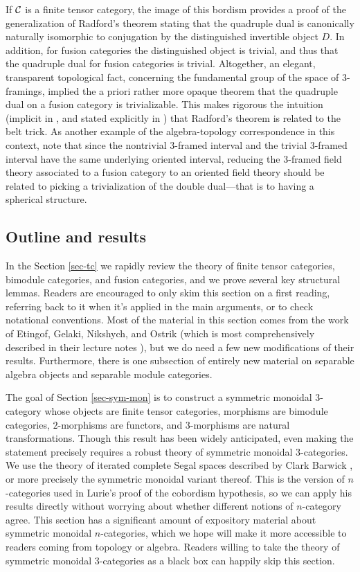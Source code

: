 \documentclass{amsart}
\begin{document}
If $\mathcal C$ is a finite tensor category, the image of this bordism provides a proof of the generalization of Radford's theorem \cite{MR0407069, MR2097289} stating that the quadruple dual is canonically naturally isomorphic to conjugation by the distinguished invertible object $D$.  In addition, for fusion categories the distinguished object is trivial, and thus that the quadruple dual for fusion categories is trivial.  Altogether, an elegant, transparent topological fact, concerning the fundamental group of the space of $3$-framings, implied the a priori rather more opaque theorem that the quadruple dual on a fusion category is trivializable. This makes rigorous the intuition (implicit in \cite{MR2559711}, and stated explicitly in \cite{0901.3975} ) that Radford's theorem is related to the belt trick.    As another example of the algebra-topology correspondence in this context, note that since the nontrivial $3$-framed interval and the trivial $3$-framed interval have the same underlying oriented interval, reducing the $3$-framed field theory associated to a fusion category to an oriented field theory should be related to picking a trivialization of the double dual---that is to having a spherical structure.

\subsection{Outline and results}

In the Section \ref{sec-tc} we rapidly review the theory of finite tensor categories, bimodule categories, and fusion categories, and we prove several key structural lemmas.  Readers are encouraged to only skim this section on a first reading, referring back to it when it's applied in the main arguments, or to check notational conventions.  Most of the material in this section comes from the work of Etingof, Gelaki, Nikshych, and Ostrik (which is most comprehensively described in their lecture notes \cite{EGNO}), but we do need a few new modifications of their results.  Furthermore, there is one subsection of entirely new material on separable algebra objects and separable module categories.  

The goal of Section \ref{sec-sym-mon} is to construct a symmetric monoidal $3$-category whose objects are finite tensor categories, morphisms are bimodule categories, $2$-morphisms are functors, and $3$-morphisms are natural transformations.  Though this result has been widely anticipated, even making the statement precisely requires a robust theory of symmetric monoidal $3$-categories.  We use the theory of iterated complete Segal spaces described by Clark Barwick \cite{???},  or more precisely the symmetric monoidal variant thereof.  This is the version of $n$-categories used in Lurie's proof of the cobordism hypothesis, so we can apply his results directly without worrying about whether different notions of $n$-category agree.  This section has a significant amount of expository material about symmetric monoidal $n$-categories, which we hope will make it more accessible to readers coming from topology or algebra.  Readers willing to take the theory of symmetric monoidal $3$-categories as a black box can happily skip this section.
\end{document}
